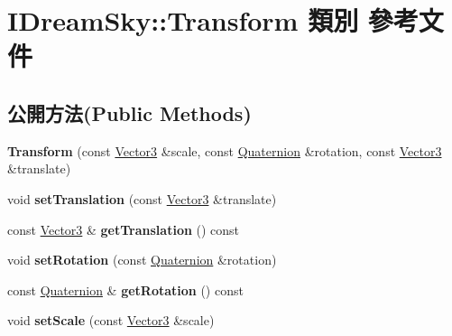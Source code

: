 \hypertarget{class_i_dream_sky_1_1_transform}{}\section{I\+Dream\+Sky\+:\+:Transform 類別 參考文件}
\label{class_i_dream_sky_1_1_transform}
\subsection*{公開方法(Public Methods)}
\begin{DoxyCompactItemize}
\item 
{\bfseries Transform} (const \hyperlink{class_i_dream_sky_1_1_vector3}{Vector3} \&scale, const \hyperlink{class_i_dream_sky_1_1_quaternion}{Quaternion} \&rotation, const \hyperlink{class_i_dream_sky_1_1_vector3}{Vector3} \&translate)\hypertarget{class_i_dream_sky_1_1_transform_ab5ac0144f58ce273b4cd3004d2cc9030}{}\label{class_i_dream_sky_1_1_transform_ab5ac0144f58ce273b4cd3004d2cc9030}

\item 
void {\bfseries set\+Translation} (const \hyperlink{class_i_dream_sky_1_1_vector3}{Vector3} \&translate)\hypertarget{class_i_dream_sky_1_1_transform_a874d4f91300cd473876b758a2b69f3ff}{}\label{class_i_dream_sky_1_1_transform_a874d4f91300cd473876b758a2b69f3ff}

\item 
const \hyperlink{class_i_dream_sky_1_1_vector3}{Vector3} \& {\bfseries get\+Translation} () const \hypertarget{class_i_dream_sky_1_1_transform_af25c2824f4186172a3b47d83cad1793f}{}\label{class_i_dream_sky_1_1_transform_af25c2824f4186172a3b47d83cad1793f}

\item 
void {\bfseries set\+Rotation} (const \hyperlink{class_i_dream_sky_1_1_quaternion}{Quaternion} \&rotation)\hypertarget{class_i_dream_sky_1_1_transform_a82f09f9b0855677f410330127ed259ec}{}\label{class_i_dream_sky_1_1_transform_a82f09f9b0855677f410330127ed259ec}

\item 
const \hyperlink{class_i_dream_sky_1_1_quaternion}{Quaternion} \& {\bfseries get\+Rotation} () const \hypertarget{class_i_dream_sky_1_1_transform_a3006df2d7a642fcecd8dfa6560f87a4a}{}\label{class_i_dream_sky_1_1_transform_a3006df2d7a642fcecd8dfa6560f87a4a}

\item 
void {\bfseries set\+Scale} (const \hyperlink{class_i_dream_sky_1_1_vector3}{Vector3} \&scale)\hypertarget{class_i_dream_sky_1_1_transform_a4b7af4739e7f6aeca62b09f6fe4045c1}{}\label{class_i_dream_sky_1_1_transform_a4b7af4739e7f6aeca62b09f6fe4045c1}


\end{DoxyCompactItemize}
